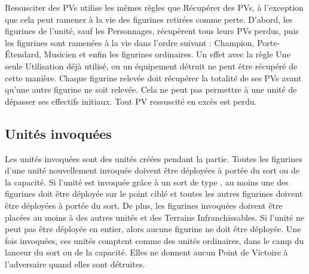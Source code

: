 Ressusciter des PVs utilise les mêmes règles que Récupérer des PVs, à l'exception que cela peut ramener à la vie des figurines retirées comme perte. D'abord, les figurines de l'unité, sauf les Personnages, récupèrent tous leurs PVs perdus, puis les figurines sont ramenées à la vie dans l'ordre suivant : Champion, Porte-Étendard, Musicien et enfin les figurines ordinaires.  Un effet avec la règle Une seule Utilisation déjà utilisé, ou un équipement détruit ne peut être récupéré de cette manière. Chaque figurine relevée doit récupérer la totalité de ses PVs avant qu'une autre figurine ne soit relevée. Cela ne peut pas permettre à une unité de dépasser ses effectifs initiaux. Tout PV ressuscité en excès est perdu.

\hypertarget{summonedunits}{\subsection{Unités invoquées}}
\label{summonedunits}

Les unités invoquées sont des unités créées pendant la partie. Toutes les figurines d'une unité nouvellement invoquée doivent être déployées à portée du sort ou de la capacité. Si l'unité est invoquée grâce à un sort de type \ground{}, au moins une des figurines doit être déployée sur le point ciblé et toutes les autres figurines doivent être déployées à portée du sort. De plus, les figurines invoquées doivent être placées au moins à  des autres unités et des Terrains Infranchissables. Si l'unité ne peut pas être déployée en entier, alors aucune figurine ne doit être déployée. Une fois invoquées, ces unités comptent comme des unités ordinaires, dans le camp du lanceur du sort ou de la capacité. Elles ne donnent aucun Point de Victoire à l'adversaire quand elles sont détruites.
